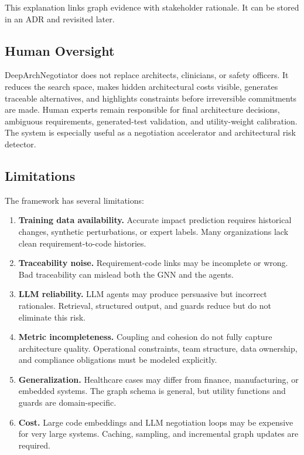 \documentclass[english,preprint,nonatbib]{elsarticle}
\begin{document}
This explanation links graph evidence with stakeholder rationale. It can be stored in an ADR and revisited later.

\subsection{Human Oversight}

DeepArchNegotiator does not replace architects, clinicians, or safety officers.
It reduces the search space, makes hidden architectural costs visible, generates traceable alternatives, and highlights constraints before irreversible commitments are made.
Human experts remain responsible for final architecture decisions, ambiguous requirements, generated-test validation, and utility-weight calibration.
The system is especially useful as a negotiation accelerator and architectural risk detector.

\subsection{Limitations}

The framework has several limitations:

\begin{enumerate}[leftmargin=2em]
  \item \textbf{Training data availability.} Accurate impact prediction requires historical changes, synthetic perturbations, or expert labels.
Many organizations lack clean requirement-to-code histories.
  \item \textbf{Traceability noise.} Requirement-code links may be incomplete or wrong.
Bad traceability can mislead both the GNN and the agents.
  \item \textbf{LLM reliability.} LLM agents may produce persuasive but incorrect rationales.
Retrieval, structured output, and guards reduce but do not eliminate this risk.
  \item \textbf{Metric incompleteness.} Coupling and cohesion do not fully capture architecture quality.
Operational constraints, team structure, data ownership, and compliance obligations must be modeled explicitly.
  \item \textbf{Generalization.} Healthcare cases may differ from finance, manufacturing, or embedded systems.
The graph schema is general, but utility functions and guards are domain-specific.
  \item \textbf{Cost.} Large code embeddings and LLM negotiation loops may be expensive for very large systems.
Caching, sampling, and incremental graph updates are required.
\end{enumerate}
\end{document}
